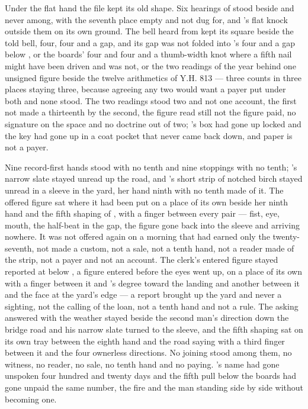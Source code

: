 Under the flat hand the file kept its old shape. Six hearings of  stood beside and never among, with the seventh place empty and not dug for, and 's flat knock outside them on its own ground. The bell heard from  kept its square beside the told bell, four, four and a gap, and its gap was not folded into 's four and a gap below , or the boards' four and four and a thumb-width knot where a fifth nail might have been driven and was not, or the two readings of the year behind one unsigned figure beside the twelve arithmetics of Y.H. 813 --- three counts in three places staying three, because agreeing any two would want a payer put under both and none stood. The two readings stood two and not one account, the first not made a thirteenth by the second, the figure read still not the figure paid, no signature on the space and no doctrine out of two; 's box had gone up  locked and the key had gone up in a coat pocket that never came back down, and paper is not a payer.

Nine record-first hands stood with no tenth and nine stoppings with no tenth; 's narrow slate stayed unread up the road, and 's short strip of notched birch stayed unread in a sleeve in the yard, her hand ninth with no tenth made of it. The offered figure sat where it had been put on a place of its own beside her ninth hand and the fifth shaping of , with a finger between every pair --- fist, eye, mouth, the half-beat in the gap, the figure gone back into the sleeve and arriving nowhere. It was not offered again on a morning that had earned only the twenty-seventh, not made a custom, not a sale, not a tenth hand, not a reader made of the strip, not a payer and not an account. The clerk's entered figure stayed reported at  below , a figure entered before the eyes went up, on a place of its own with a finger between it and 's degree toward the landing and another between it and the face at the yard's edge --- a report brought up the yard and never a sighting, not the calling of the loan, not a tenth hand and not a rule. The asking answered with the weather stayed beside the second man's direction down the bridge road and his narrow slate turned to the sleeve, and the fifth shaping sat on its own tray between the eighth hand and the road saying with a third finger between it and the four ownerless directions. No joining stood among them, no witness, no reader, no sale, no tenth hand and no paying. 's name had gone unspoken four hundred and twenty days and the fifth pull below the boards had gone unpaid the same number, the fire and the man standing side by side without becoming one.

